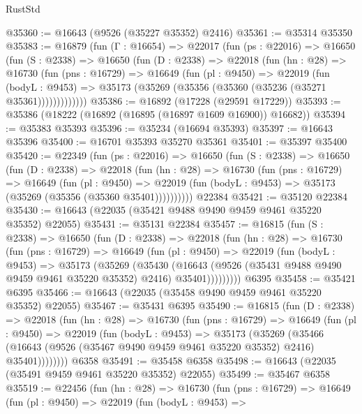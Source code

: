 \begin{lexlean}{RustStd}
\begin{coremodule}
@35360 := @16643 (@9526 (@35227 @35352) @2416)
@35361 := @35314 @35350
@35383 := @16879
    (fun (Γ : @16654) =>
    @22017
      (fun (ps : @22016) =>
      @16650
        (fun (S : @2338) =>
        @16650
          (fun (D : @2338) =>
          @22018
            (fun (hn : @28) =>
            @16730
              (fun (pns : @16729) =>
              @16649
                (fun (pl : @9450) =>
                @22019
                  (fun (bodyL : @9453) =>
                  @35173 (@35269 (@35356 (@35360 (@35236 (@35271 @35361)))))))))))))
@35386 := @16892 (@17228 (@29591 @17229))
@35393 := @35386 (@18222 (@16892 (@16895 (@16897 @1609 @16900)) @16682))
@35394 := @35383 @35393
@35396 := @35234 (@16694 @35393)
@35397 := @16643 @35396
@35400 := @16701 @35393 @35270 @35361
@35401 := @35397 @35400
@35420 := @22349
    (fun (ps : @22016) =>
    @16650
      (fun (S : @2338) =>
      @16650
        (fun (D : @2338) =>
        @22018
          (fun (hn : @28) =>
          @16730
            (fun (pns : @16729) =>
            @16649
              (fun (pl : @9450) =>
              @22019 (fun (bodyL : @9453) => @35173 (@35269 (@35356 (@35360 @35401))))))))))
    @22384
@35421 := @35120 @22384
@35430 := @16643 (@22035 (@35421 @9488 @9490 @9459 @9461 @35220 @35352) @22055)
@35431 := @35131 @22384
@35457 := @16815
    (fun (S : @2338) =>
    @16650
      (fun (D : @2338) =>
      @22018
        (fun (hn : @28) =>
        @16730
          (fun (pns : @16729) =>
          @16649
            (fun (pl : @9450) =>
            @22019
              (fun (bodyL : @9453) =>
              @35173
                (@35269
                  (@35430
                    (@16643
                      (@9526 (@35431 @9488 @9490 @9459 @9461 @35220 @35352) @2416)
                      @35401)))))))))
    @6395
@35458 := @35421 @6395
@35466 := @16643 (@22035 (@35458 @9490 @9459 @9461 @35220 @35352) @22055)
@35467 := @35431 @6395
@35490 := @16815
    (fun (D : @2338) =>
    @22018
      (fun (hn : @28) =>
      @16730
        (fun (pns : @16729) =>
        @16649
          (fun (pl : @9450) =>
          @22019
            (fun (bodyL : @9453) =>
            @35173
              (@35269
                (@35466
                  (@16643 (@9526 (@35467 @9490 @9459 @9461 @35220 @35352) @2416) @35401))))))))
    @6358
@35491 := @35458 @6358
@35498 := @16643 (@22035 (@35491 @9459 @9461 @35220 @35352) @22055)
@35499 := @35467 @6358
@35519 := @22456
    (fun (hn : @28) =>
    @16730
      (fun (pns : @16729) =>
      @16649
        (fun (pl : @9450) =>
        @22019
          (fun (bodyL : @9453) =>

\end{coremodule}
\end{lexlean}
